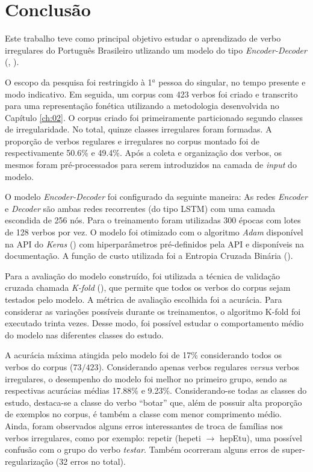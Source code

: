 \chapter{Conclusão}
\label{ch:08}

Este trabalho teve como principal objetivo estudar o aprendizado de verbo irregulares do Português Brasileiro utlizando um modelo do tipo \textit{Encoder-Decoder} (\cite{enc-dec:2014}, \cite{seq2seq:2014}). 

O escopo da pesquisa foi restringido à 1$^{a}$ pessoa do singular, no tempo presente e modo indicativo. Em seguida, um corpus com 423 verbos foi criado e transcrito para uma representação fonética utilizando a metodologia desenvolvida no Capítulo \ref{ch:02}. O corpus criado foi primeiramente particionado segundo classes de irregularidade. No total, quinze classes irregulares foram formadas. A proporção de verbos regulares e irregulares no corpus montado foi de respectivamente 50.6\% e 49.4\%. Após a coleta e organização dos verbos, os mesmos foram pré-processados para serem introduzidos na camada de \textit{input} do modelo. 

O modelo \textit{Encoder-Decoder} foi configurado da seguinte maneira: As redes \textit{Encoder} e \textit{Decoder} são ambas redes recorrentes (do tipo LSTM) com uma camada escondida de 256 nós. Para o treinamento foram utilizadas 300 épocas com lotes de 128 verbos por vez. O modelo foi otimizado com o algoritmo \textit{Adam} disponível na API do \textit{Keras} (\cite{chollet2015keras}) com hiperparâmetros pré-definidos pela API e disponíveis na documentação. A função de custo utilizada foi a Entropia Cruzada Binária (\cite{francois2017deep}).

Para a avaliação do modelo construído, foi utilizada a técnica de validação cruzada chamada \textit{K-fold} (\cite{kfold:2018}), que permite que todos os verbos do corpus sejam testados pelo modelo. A métrica de avaliação escolhida foi a acurácia. Para considerar as variações possíveis durante os treinamentos, o algoritmo K-fold foi executado trinta vezes. Desse modo, foi possível estudar o comportamento médio do modelo nas diferentes classes do estudo.

A acurácia máxima atingida pelo modelo foi de 17\% considerando todos os verbos do corpus ($73/423$). Considerando apenas verbos regulares \textit{versus} verbos irregulares, o desempenho do modelo foi melhor no primeiro grupo, sendo as respectivas acurácias médias 17.88\% e 9.23\%. Considerando-se todas as classes do estudo, destaca-se a classe do verbo “botar” que, além de possuir alta proporção de exemplos no corpus, é também a classe com menor comprimento médio. Ainda, foram observados alguns erros interessantes de troca de famílias nos verbos irregulares, como por exemplo: repetir (hepeti $\rightarrow$ hepEtu), uma possível confusão com o grupo do verbo \textit{testar}. Também ocorreram alguns erros de super-regularização (32 erros no total). 

